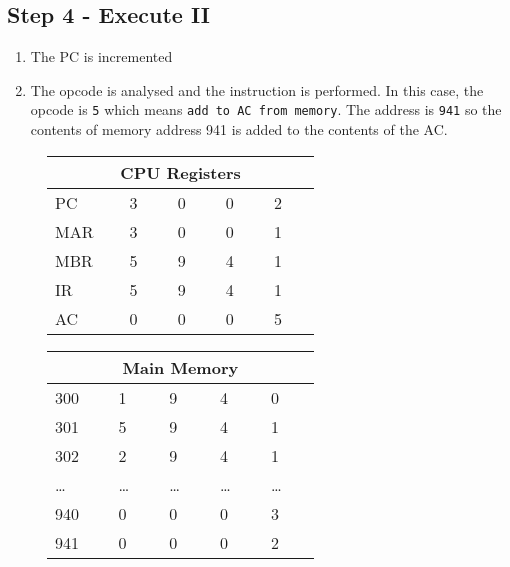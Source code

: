 \subsection*{Step 4 - Execute II}
\begin{enumerate}
    \item The PC is incremented
    \item The opcode is analysed and the instruction is performed. In this case, the opcode is \verb|5| which means \verb|add to AC from memory|. The address is \verb|941| so the contents of memory address 941 is added to the contents of the AC. 
\end{enumerate}

\begin{figure}[H]
    \begin{minipage}[t]{0.45\textwidth}
        \centering
        \begin{tabular}[H]{p{0.15\linewidth} p{0.12\linewidth} p{0.12\linewidth} p{0.12\linewidth} p{0.12\linewidth}}
            \multicolumn{5}{c}{\textbf{CPU Registers}}\\
            \hline
            \hline
            PC & 3 & 0 & 0 & 2 \\
            \hline
            MAR & 3 & 0 & 0 & 1 \\
            \hline
            MBR & 5 & 9 & 4 & 1 \\
            \hline
            IR & 5 & 9 & 4 & 1 \\
            \hline
            AC & 0 & 0 & 0 & 5 \\
            \hline
        \end{tabular}
    \end{minipage}\hfill
    \begin{minipage}[t]{0.45\textwidth}
        \centering
        \begin{tabular}[H]{p{0.15\linewidth} p{0.12\linewidth} p{0.12\linewidth} p{0.12\linewidth} p{0.12\linewidth}}
            \multicolumn{5}{c}{\textbf{Main Memory}}\\
            \hline
            \hline
            300 & 1 & 9 & 4 & 0 \\
            \hline
            301 & 5 & 9 & 4 & 1 \\
            \hline
            302 & 2 & 9 & 4 & 1 \\
            \hline
            \ldots & \ldots & \ldots & \ldots & \ldots \\
            \hline
            940 & 0 & 0 & 0 & 3 \\
            \hline
            941 & 0 & 0 & 0 & 2 \\
            \hline
        \end{tabular}
    \end{minipage}\hfill
\end{figure}

